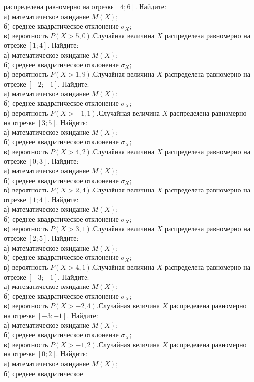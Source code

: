 распределена равномерно на отрезке $[4; 6]$. Найдите: \\ \quad а) математическое ожидание $M(X)$; \\ \quad б) среднее квадратическое отклонение $\sigma_X$; \\ \quad в) вероятность $P(X>5{,}0)$.Случайная величина $X$ распределена равномерно на отрезке $[1; 4]$. Найдите: \\ \quad а) математическое ожидание $M(X)$; \\ \quad б) среднее квадратическое отклонение $\sigma_X$; \\ \quad в) вероятность $P(X>1{,}9)$.Случайная величина $X$ распределена равномерно на отрезке $[-2; -1]$. Найдите: \\ \quad а) математическое ожидание $M(X)$; \\ \quad б) среднее квадратическое отклонение $\sigma_X$; \\ \quad в) вероятность $P(X>-1{,}1)$.Случайная величина $X$ распределена равномерно на отрезке $[3; 5]$. Найдите: \\ \quad а) математическое ожидание $M(X)$; \\ \quad б) среднее квадратическое отклонение $\sigma_X$; \\ \quad в) вероятность $P(X>4{,}2)$.Случайная величина $X$ распределена равномерно на отрезке $[0; 3]$. Найдите: \\ \quad а) математическое ожидание $M(X)$; \\ \quad б) среднее квадратическое отклонение $\sigma_X$; \\ \quad в) вероятность $P(X>2{,}4)$.Случайная величина $X$ распределена равномерно на отрезке $[1; 4]$. Найдите: \\ \quad а) математическое ожидание $M(X)$; \\ \quad б) среднее квадратическое отклонение $\sigma_X$; \\ \quad в) вероятность $P(X>3{,}1)$.Случайная величина $X$ распределена равномерно на отрезке $[2; 5]$. Найдите: \\ \quad а) математическое ожидание $M(X)$; \\ \quad б) среднее квадратическое отклонение $\sigma_X$; \\ \quad в) вероятность $P(X>4{,}1)$.Случайная величина $X$ распределена равномерно на отрезке $[-3; -1]$. Найдите: \\ \quad а) математическое ожидание $M(X)$; \\ \quad б) среднее квадратическое отклонение $\sigma_X$; \\ \quad в) вероятность $P(X>-2{,}4)$.Случайная величина $X$ распределена равномерно на отрезке $[-3; -1]$. Найдите: \\ \quad а) математическое ожидание $M(X)$; \\ \quad б) среднее квадратическое отклонение $\sigma_X$; \\ \quad в) вероятность $P(X>-1{,}2)$.Случайная величина $X$ распределена равномерно на отрезке $[0; 2]$. Найдите: \\ \quad а) математическое ожидание $M(X)$; \\ \quad б) среднее квадратическое 